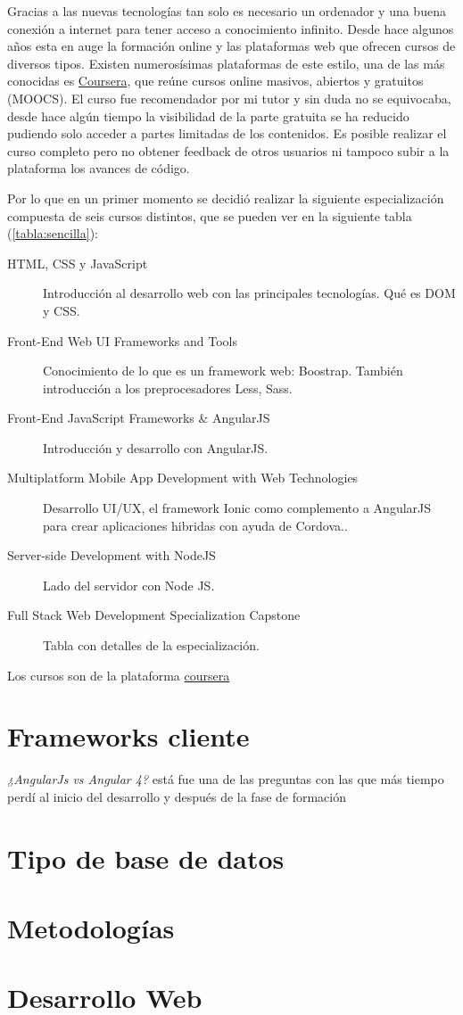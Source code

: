 Gracias a las nuevas tecnologías tan solo es necesario un ordenador y una buena conexión a internet para tener acceso a conocimiento infinito. Desde hace algunos años esta en auge la formación online y las plataformas web que ofrecen cursos de diversos tipos. Existen numerosísimas plataformas de este estilo, una de las más conocidas es  \hyperlink{www.coursera.org}{Coursera}, que reúne cursos online masivos, abiertos y gratuitos (MOOCS). El curso fue recomendador por mi tutor y sin duda no se equivocaba, desde hace algún tiempo la visibilidad de la parte gratuita se ha reducido pudiendo solo acceder a partes limitadas de los contenidos. Es posible realizar el curso completo pero no obtener feedback de otros usuarios ni tampoco subir a la plataforma los avances de código.

Por lo que en un primer momento se decidió realizar la siguiente especialización compuesta de seis cursos distintos, que se pueden ver en la siguiente tabla (\ref{tabla:sencilla}):


\begin{description}
	\item[HTML, CSS y JavaScript] Introducción al desarrollo web con las principales tecnologías. Qué es DOM y CSS.
	\item[ Front-End Web UI Frameworks and Tools] Conocimiento de lo que es un framework web: Boostrap. También introducción a los preprocesadores Less, Sass.
	\item[Front-End JavaScript Frameworks & AngularJS ]  Introducción y desarrollo con AngularJS.
	\item[ Multiplatform Mobile App Development with Web Technologies] Desarrollo UI/UX, el framework Ionic como complemento a AngularJS para  crear aplicaciones hibridas con ayuda de Cordova..
	\item[ Server-side Development with NodeJS ] Lado del servidor con Node JS.
	\item[ Full Stack Web Development Specialization Capstone] Tabla con detalles de la especialización.
\end{description}

Los cursos son de la plataforma \hyperlink{www.coursera.org}{coursera}

  
 \section{Frameworks cliente}\label{cliente}
 
 \emph{¿AngularJs vs Angular 4?} está fue una de las preguntas con las que más tiempo perdí al inicio del desarrollo y después de la fase de formación
 
 \section{Tipo de base de datos}\label{base de datos}
  
  
  \section{Metodologías}\label{metodologías}  
  
  
    \section{Desarrollo Web}\label{desarrollo-web}  



